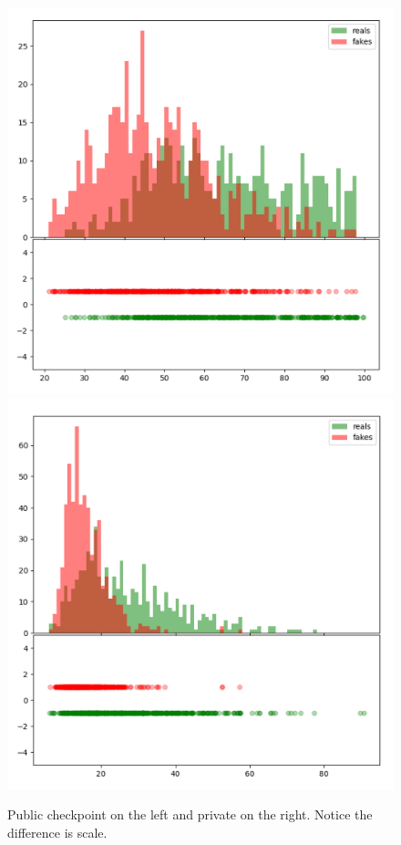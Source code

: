 \documentclass{article}
\begin{document}
\begin{figure}[tb]
\vspace{2mm}
 \centering
\includegraphics[width=0.45\columnwidth]{public_preplexity}
\includegraphics[width=0.45\columnwidth]{private_preplexity}
\vspace{-1mm}
\caption{Public checkpoint on the left and private on the right. Notice the difference is scale.}
\label{Fig:perplexity}
\vspace{-3mm}
\end{figure}
\end{document}
